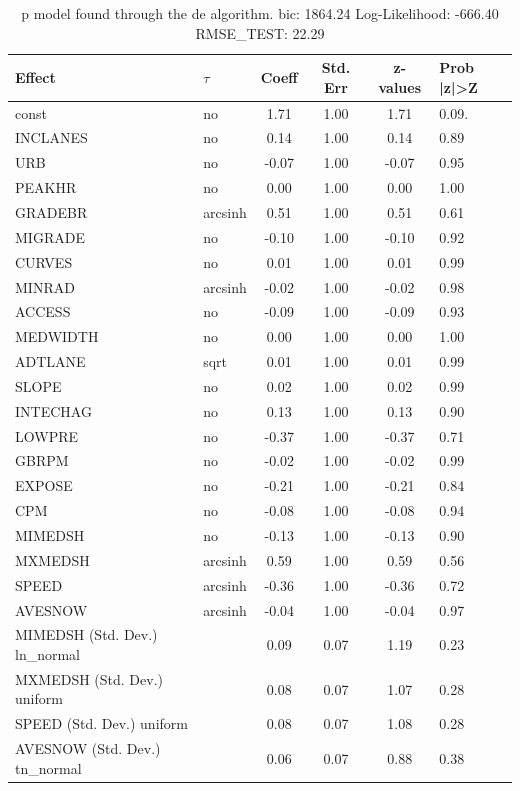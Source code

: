\begin{table}
	\caption{p model found through the de algorithm. bic: 1864.24 Log-Likelihood: -666.40 RMSE_TEST: 22.29}
	\begin{center}
		\begin{tabular}{|l|l|c|c|c|l|}
			\hline
			Effect & $\tau$ & Coeff & Std. Err & z-values & Prob |z|>Z \\
			\hline
			const & no & 1.71 & 1.00 & 1.71 & 0.09. \\
			\hline
			INCLANES & no & 0.14 & 1.00 & 0.14 & 0.89 \\
			\hline
			URB & no & -0.07 & 1.00 & -0.07 & 0.95 \\
			\hline
			PEAKHR & no & 0.00 & 1.00 & 0.00 & 1.00 \\
			\hline
			GRADEBR & arcsinh & 0.51 & 1.00 & 0.51 & 0.61 \\
			\hline
			MIGRADE & no & -0.10 & 1.00 & -0.10 & 0.92 \\
			\hline
			CURVES & no & 0.01 & 1.00 & 0.01 & 0.99 \\
			\hline
			MINRAD & arcsinh & -0.02 & 1.00 & -0.02 & 0.98 \\
			\hline
			ACCESS & no & -0.09 & 1.00 & -0.09 & 0.93 \\
			\hline
			MEDWIDTH & no & 0.00 & 1.00 & 0.00 & 1.00 \\
			\hline
			ADTLANE & sqrt & 0.01 & 1.00 & 0.01 & 0.99 \\
			\hline
			SLOPE & no & 0.02 & 1.00 & 0.02 & 0.99 \\
			\hline
			INTECHAG & no & 0.13 & 1.00 & 0.13 & 0.90 \\
			\hline
			LOWPRE & no & -0.37 & 1.00 & -0.37 & 0.71 \\
			\hline
			GBRPM & no & -0.02 & 1.00 & -0.02 & 0.99 \\
			\hline
			EXPOSE & no & -0.21 & 1.00 & -0.21 & 0.84 \\
			\hline
			CPM & no & -0.08 & 1.00 & -0.08 & 0.94 \\
			\hline
			MIMEDSH & no & -0.13 & 1.00 & -0.13 & 0.90 \\
			\hline
			MXMEDSH & arcsinh & 0.59 & 1.00 & 0.59 & 0.56 \\
			\hline
			SPEED & arcsinh & -0.36 & 1.00 & -0.36 & 0.72 \\
			\hline
			AVESNOW & arcsinh & -0.04 & 1.00 & -0.04 & 0.97 \\
			\hline
			MIMEDSH (Std. Dev.) ln_normal &  & 0.09 & 0.07 & 1.19 & 0.23 \\
			\hline
			MXMEDSH (Std. Dev.) uniform &  & 0.08 & 0.07 & 1.07 & 0.28 \\
			\hline
			SPEED (Std. Dev.) uniform &  & 0.08 & 0.07 & 1.08 & 0.28 \\
			\hline
			AVESNOW (Std. Dev.) tn_normal &  & 0.06 & 0.07 & 0.88 & 0.38 \\
			\hline
		\end{tabular}
	\end{center}
\end{table}